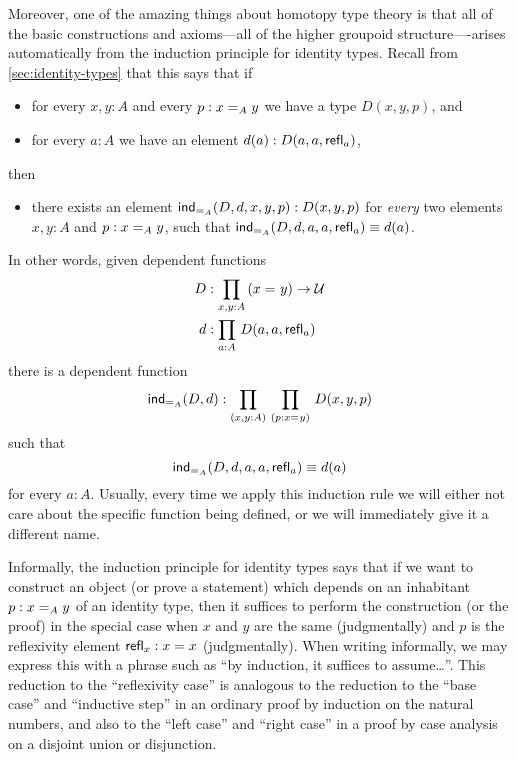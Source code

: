 Moreover, one of the amazing things about homotopy type theory is that all of the basic constructions and axioms---all of the
higher groupoid structure----arises automatically from the induction
principle for identity types.
Recall from \autoref{sec:identity-types} that this says that if
\begin{itemize}
\item for every $x,y:A$ and every $p:\id[A]xy$ we have a type $D(x,y,p)$, and
\item for every $a:A$ we have an element $d(a):D(a,a,\refl a)$, 
\end{itemize}
then
\begin{itemize}
\item there exists an element $\indid{A}(D,d,x,y,p):D(x,y,p)$ for \emph{every} two elements $x,y:A$ and $p:\id[A]xy$, such that $\indid{A}(D,d,a,a,\refl a) \jdeq d(a)$.
\end{itemize}
In other words, given dependent functions
\begin{align*}
D & :\prd{x,y:A} (\id{x}{y}) \to \type\\
d & :\prd{a:A} D(a,a,\refl{a})
\end{align*}
there is a dependent function
\[\indid{A}(D,d):\prd{x,y:A}{p:\id{x}{y}} D(x,y,p)\]
such that 
\begin{equation}\label{eq:Jconv}
\indid{A}(D,d,a,a,\refl{a})\jdeq d(a)
\end{equation}
for every $a:A$.
Usually, every time we apply this induction rule we will either not care about the specific function being defined, or we will immediately give it a different name.

Informally, the induction principle for identity types says that if we want to construct an object (or prove a statement) which depends on an inhabitant $p:\id[A]xy$ of an identity type, then it suffices to perform the construction (or the proof) in the special case when $x$ and $y$ are the same (judgmentally) and $p$ is the reflexivity element $\refl{x}:x=x$ (judgmentally).
When writing informally, we may express this with a phrase such as ``by induction, it suffices to assume\dots''.
This reduction to the ``reflexivity case'' is analogous to the reduction to the ``base case'' and ``inductive step'' in an ordinary proof by induction on the natural numbers, and also to the ``left case'' and ``right case'' in a proof by case analysis on a disjoint union or disjunction.%


